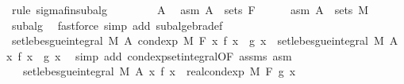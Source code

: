 \begin{isabellebody}
\ {\isacharparenleft}{\kern0pt}rule\ sigma{\isacharunderscore}{\kern0pt}fin{\isacharunderscore}{\kern0pt}subalg{\isacharparenright}{\kern0pt}\isanewline
\ \ \isacommand{{\isacharbraceleft}{\kern0pt}}\isamarkupfalse%
\isanewline
\ \ \ \ \isamarkupfalse%
\ A\ \isamarkupfalse%
\ asm{\isacharcolon}{\kern0pt}\ {\isachardoublequoteopen}A\ {\isasymin}\ sets\ F{\isachardoublequoteclose}\isanewline
\ \ \ \ \isamarkupfalse%
\ asm{\isacharprime}{\kern0pt}{\isacharcolon}{\kern0pt}\ {\isachardoublequoteopen}A\ {\isasymin}\ sets\ M{\isachardoublequoteclose}\ \isamarkupfalse%
\ subalg\ \isamarkupfalse%
\ {\isacharparenleft}{\kern0pt}fastforce\ simp\ add{\isacharcolon}{\kern0pt}\ subalgebra{\isacharunderscore}{\kern0pt}def{\isacharparenright}{\kern0pt}\isanewline
\ \ \ \ \isamarkupfalse%
\ {\isachardoublequoteopen}set{\isacharunderscore}{\kern0pt}lebesgue{\isacharunderscore}{\kern0pt}integral\ M\ A\ {\isacharparenleft}{\kern0pt}cond{\isacharunderscore}{\kern0pt}exp\ M\ F\ {\isacharparenleft}{\kern0pt}{\isasymlambda}x{\isachardot}{\kern0pt}\ f\ x\ {\isacharasterisk}{\kern0pt}\ g\ x{\isacharparenright}{\kern0pt}{\isacharparenright}{\kern0pt}\ {\isacharequal}{\kern0pt}\ set{\isacharunderscore}{\kern0pt}lebesgue{\isacharunderscore}{\kern0pt}integral\ M\ A\ {\isacharparenleft}{\kern0pt}{\isasymlambda}x{\isachardot}{\kern0pt}\ f\ x\ {\isacharasterisk}{\kern0pt}\ g\ x{\isacharparenright}{\kern0pt}{\isachardoublequoteclose}\ \isamarkupfalse%
\ {\isacharparenleft}{\kern0pt}simp\ add{\isacharcolon}{\kern0pt}\ cond{\isacharunderscore}{\kern0pt}exp{\isacharunderscore}{\kern0pt}set{\isacharunderscore}{\kern0pt}integral{\isacharbrackleft}{\kern0pt}OF\ assms{\isacharparenleft}{\kern0pt}{}{\isacharparenright}{\kern0pt}\ asm{\isacharbrackright}{\kern0pt}{\isacharparenright}{\kern0pt}\isanewline
\ \ \ \ \isamarkupfalse%
\ \isamarkupfalse%
\ {\isachardoublequoteopen}{\isachardot}{\kern0pt}{\isachardot}{\kern0pt}{\isachardot}{\kern0pt}\ {\isacharequal}{\kern0pt}\ set{\isacharunderscore}{\kern0pt}lebesgue{\isacharunderscore}{\kern0pt}integral\ M\ A\ {\isacharparenleft}{\kern0pt}{\isasymlambda}x{\isachardot}{\kern0pt}\ f\ x\ {\isacharasterisk}{\kern0pt}\ real{\isacharunderscore}{\kern0pt}cond{\isacharunderscore}{\kern0pt}exp\ M\ F\ g\ x{\isacharparenright}{\kern0pt}{\isachardoublequoteclose}\ \isamarkupfalse%

\end{isabellebody}
